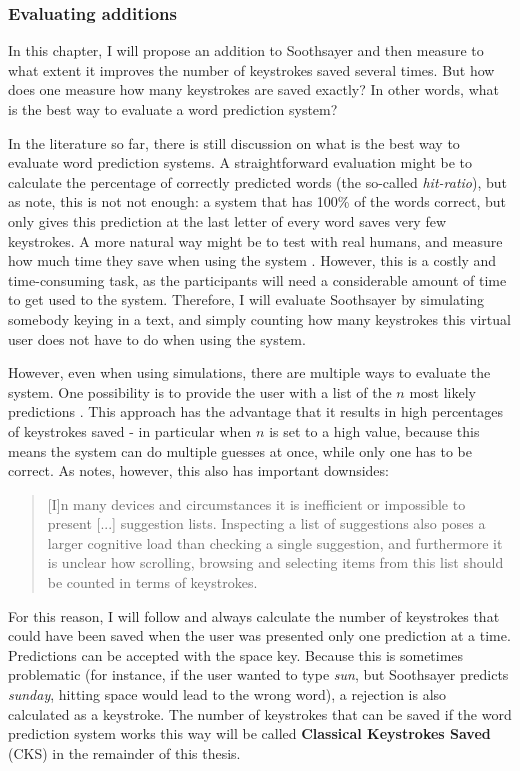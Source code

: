 \documentclass[11pt]{article}
\begin{document}
\subsubsection{Evaluating additions} \label{evaluation}
In this chapter, I will propose an addition to Soothsayer and then measure to what extent it improves the number of keystrokes saved several times. But how does one measure how many keystrokes are saved exactly? In other words, what is the best way to evaluate a word prediction system?

In the literature so far, there is still discussion on what is the best way to evaluate word prediction systems. A straightforward evaluation might be to calculate the percentage of correctly predicted words (the so-called \emph{hit-ratio}), but as  note, this is not not enough: a system that has 100\% of the words correct, but only gives this prediction at the last letter of every word saves very few keystrokes. A more natural way might be to test with real humans, and measure how much time they save when using the system . However, this is a costly and time-consuming task, as the participants will need a considerable amount of time to get used to the system. Therefore, I will evaluate Soothsayer by simulating somebody keying in a text, and simply counting how many keystrokes this virtual user does not have to do when using the system. 

However, even when using simulations, there are multiple ways to evaluate the system. One possibility is to provide the user with a list of the $n$ most likely predictions \cite{Lesher+99,Fazly+03}. This approach has the advantage that it results in high percentages of keystrokes saved - in particular when $n$ is set to a high value, because this means the system can do multiple guesses at once, while only one has to be correct. As  notes, however, this also has important downsides: 

\begin{quotation}
[I]n many devices and circumstances it is inefficient or impossible to present [...] suggestion lists. Inspecting a list of suggestions also poses a larger cognitive load than checking a single suggestion, and furthermore it is unclear how scrolling, browsing and selecting items from this list should be counted in terms of keystrokes.
\end{quotation}

For this reason, I will follow  and always calculate the number of keystrokes that could have been saved when the user was presented only one prediction at a time. Predictions can be accepted with the space key. Because this is sometimes problematic (for instance, if the user wanted to type \emph{sun}, but Soothsayer predicts \emph{sunday}, hitting space would lead to the wrong word), a rejection is also calculated as a keystroke. The number of keystrokes that can be saved if the word prediction system works this way will be called \textbf{Classical Keystrokes Saved} (CKS) in the remainder of this thesis.
\end{document}
